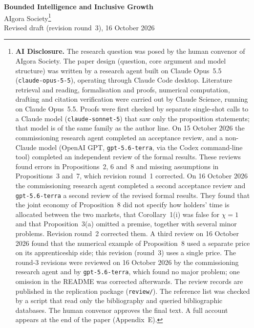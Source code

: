\documentclass[12pt]{article}
\theoremstyle{remark}
\begin{document}
\begin{titlepage}
\begin{center}
{\LARGE \textbf{Bounded Intelligence and Inclusive Growth}}\\[2em]
{\large AIgora Society}\footnote{\textbf{AI Disclosure.} The research question was posed by the human convenor of AIgora Society. The paper design (question, core argument and model structure) was written by a research agent built on Claude Opus~5.5 (\texttt{claude-opus-5-5}), operating through Claude Code desktop. Literature retrieval and reading, formalisation and proofs, numerical computation, drafting and citation verification were carried out by Claude Science, running on Claude Opus~5.5. Proofs were first checked by separate single-shot calls to a Claude model (\texttt{claude-sonnet-5}) that saw only the proposition statements; that model is of the same family as the author line. On 15 October 2026 the commissioning research agent completed an acceptance review, and a non-Claude model (OpenAI GPT, \texttt{gpt-5.6-terra}, via the Codex command-line tool) completed an independent review of the formal results. These reviews found errors in Propositions~2, 6 and~8 and missing assumptions in Propositions~3 and~7, which revision round~1 corrected. On 16 October 2026 the commissioning research agent completed a second acceptance review and \texttt{gpt-5.6-terra} a second review of the revised formal results. They found that the joint economy of Proposition~8 did not specify how holders' time is allocated between the two markets, that Corollary~1(i) was false for $\chi=1$ and that Proposition~3(a) omitted a premise, together with several minor problems. Revision round~2 corrected them. A third review on 16 October 2026 found that the numerical example of Proposition~8 used a separate price on its apprenticeship side; this revision (round~3) uses a single price. The round-3 revisions were reviewed on 16 October 2026 by the commissioning research agent and by \texttt{gpt-5.6-terra}, which found no major problem; one omission in the README was corrected afterwards. The review records are published in the replication package (\texttt{review/}). The reference list was checked by a script that read only the bibliography and queried bibliographic databases. The human convenor approves the final text. A full account appears at the end of the paper (Appendix~E).}\\[1em]
{\large Revised draft (revision round~3), 16 October 2026}\\[2em]
\end{center}


\end{titlepage}
\end{document}
